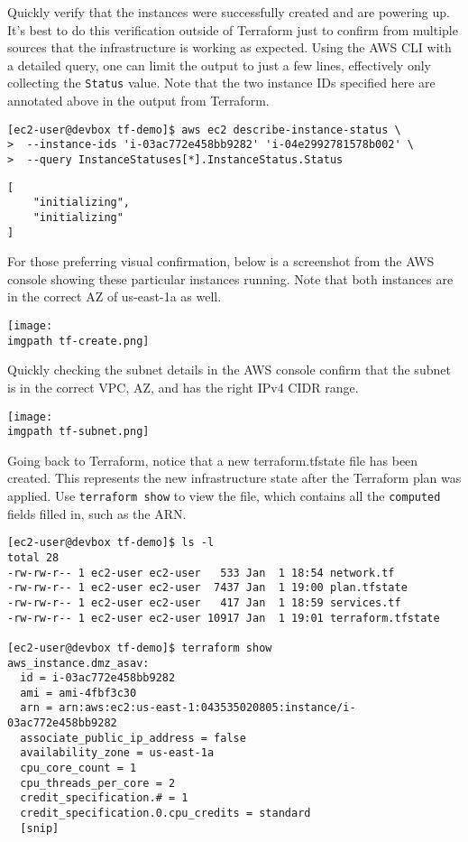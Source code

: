 Quickly verify that the instances were successfully created and are powering
up. It's best to do this verification outside of Terraform just to confirm
from multiple sources that the infrastructure is working as expected. Using
the AWS CLI with a detailed query, one can limit the output to just a few
lines, effectively only collecting the \verb|Status| value. Note that the two
instance IDs specified here are annotated above in the output from Terraform.

\begin{verbatim}
[ec2-user@devbox tf-demo]$ aws ec2 describe-instance-status \
>  --instance-ids 'i-03ac772e458bb9282' 'i-04e2992781578b002' \
>  --query InstanceStatuses[*].InstanceStatus.Status
\end{verbatim}

\begin{verbatim}
[
    "initializing",
    "initializing"
]
\end{verbatim}

For those preferring visual confirmation, below is a screenshot from the AWS
console showing these particular instances running. Note that both instances
are in the correct AZ of us-east-1a as well.

    \begin{minipage}[t]{\linewidth}
	  \centering
      \texttt{[image: \\imgpath tf-create.png]}
    \end{minipage}

Quickly checking the subnet details in the AWS console confirm that the subnet
is in the correct VPC, AZ, and has the right IPv4 CIDR range.

    \begin{minipage}[t]{\linewidth}
	  \centering
      \texttt{[image: \\imgpath tf-subnet.png]}
    \end{minipage}

Going back to Terraform, notice that a new terraform.tfstate file has been
created. This represents the new infrastructure state after the Terraform plan
was applied. Use \verb|terraform show| to view the file, which contains all the
\verb|computed| fields filled in, such as the ARN.

\begin{verbatim}
[ec2-user@devbox tf-demo]$ ls -l
total 28
-rw-rw-r-- 1 ec2-user ec2-user   533 Jan  1 18:54 network.tf
-rw-rw-r-- 1 ec2-user ec2-user  7437 Jan  1 19:00 plan.tfstate
-rw-rw-r-- 1 ec2-user ec2-user   417 Jan  1 18:59 services.tf
-rw-rw-r-- 1 ec2-user ec2-user 10917 Jan  1 19:01 terraform.tfstate

[ec2-user@devbox tf-demo]$ terraform show
aws_instance.dmz_asav:
  id = i-03ac772e458bb9282
  ami = ami-4fbf3c30
  arn = arn:aws:ec2:us-east-1:043535020805:instance/i-03ac772e458bb9282
  associate_public_ip_address = false
  availability_zone = us-east-1a
  cpu_core_count = 1
  cpu_threads_per_core = 2
  credit_specification.# = 1
  credit_specification.0.cpu_credits = standard
  [snip]
\end{verbatim}

